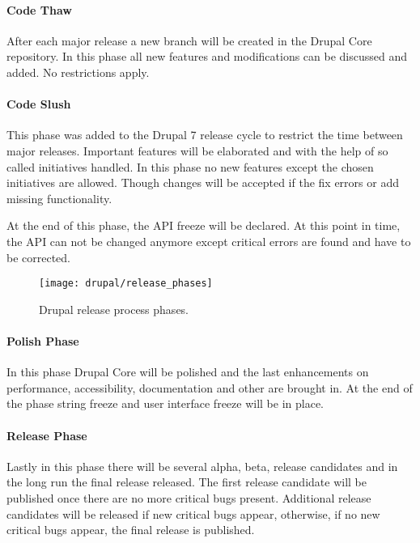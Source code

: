 \paragraph{Code Thaw}

After each major release a new branch will be created in the Drupal Core
repository. In this phase all new features and modifications can be discussed
and added. No restrictions apply.

\paragraph{Code Slush}

This phase was added to the Drupal 7 release cycle to restrict the time between
major releases. Important features will be elaborated and with the help of so
called initiatives handled. In this phase no new features except the chosen
initiatives are allowed. Though changes will be accepted if the fix errors or
add missing functionality.

At the end of this phase, the \ac{API} freeze will be declared. At this point
in time, the \ac{API} can not be changed anymore except critical errors are
found and have to be corrected.

\begin{figure}[htbp]
  \centering
  \texttt{[image: drupal/release\_phases]}
  \caption{Drupal release process phases.}
\end{figure}

\paragraph{Polish Phase}

In this phase Drupal Core will be polished and the last enhancements on
performance, accessibility, documentation and other are brought in. At the end
of the phase string freeze and user interface freeze will be in place.

\paragraph{Release Phase}

Lastly in this phase there will be several alpha, beta, release candidates and
in the long run the final release released. The first release candidate will be
published once there are no more critical bugs present. Additional release
candidates will be released if new critical bugs appear, otherwise, if no new
critical bugs appear, the final release is published.

